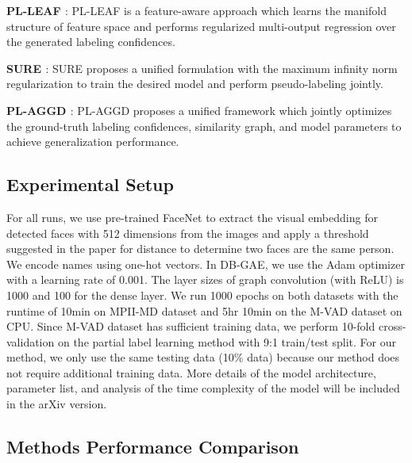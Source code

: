 \documentclass[letterpaper]{article} \usepackage{aaai20}  \usepackage{times}  \usepackage{helvet} \usepackage{courier}  \usepackage[hyphens]{url}  \usepackage{graphicx} \urlstyle{rm} \def\UrlFont{\rm}  \frenchspacing  \setlength{\pdfpagewidth}{8.5in}  \setlength{\pdfpageheight}{11in}  \frenchspacing
\begin{document}
\noindent\textbf{PL-LEAF \cite{zhang2016partial}}: PL-LEAF is a feature-aware approach which learns the manifold structure of feature space and performs regularized multi-output regression over the generated labeling confidences.

\noindent\textbf{SURE \cite{feng2019partial}}: SURE proposes a unified formulation with the maximum infinity norm regularization to train the desired model and perform pseudo-labeling jointly.

\noindent\textbf{PL-AGGD \cite{wang2019adaptive}}: PL-AGGD proposes a unified framework which jointly optimizes the ground-truth labeling confidences, similarity graph, and model parameters to achieve generalization performance.




\subsection{Experimental Setup}
For all runs, we use pre-trained FaceNet \cite{schroff2015facenet} to extract the visual embedding for detected faces with 512 dimensions from the images and apply a threshold  suggested in the paper \cite{schroff2015facenet} for  distance to determine two faces are the same person. We encode names using one-hot vectors. In DB-GAE, we use the Adam optimizer \cite{kingma2014adam} with a learning rate of 0.001. The layer sizes of graph convolution (with ReLU) is 1000 and 100 for the dense layer. We run 1000 epochs on both datasets with the runtime of 10min on MPII-MD dataset and 5hr 10min on the M-VAD dataset on CPU.
 Since M-VAD dataset has sufficient training data, we perform 10-fold cross-validation on the partial label learning method with 9:1 train/test split. For our method, we only use the same testing data (10\% data) because our method does not require additional training data. More details of the model architecture, parameter list, and analysis of the time complexity of the model will be included in the arXiv version.



 



\subsection{Methods Performance Comparison}
\end{document}
